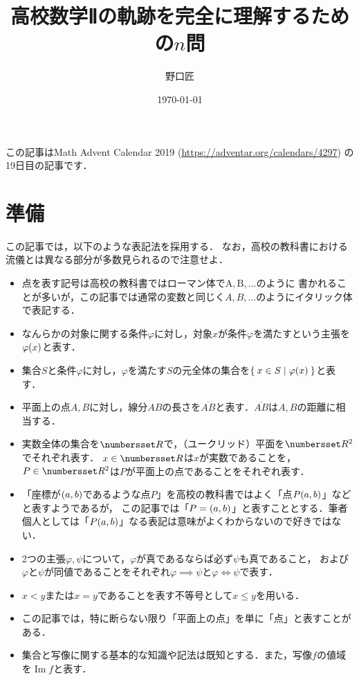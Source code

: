 \documentclass[11pt,a4paper]{ltjsarticle}
\title{高校数学Ⅱの軌跡を完全に理解するための$n$問}
\author{野口匠}
\affil{高知工科大学大学院工学研究科}
\date{\today}
\newcommand*{\length}[1]{\overline{#1}}
\newcommand*{\equivalent}{\Longleftrightarrow}
\newcommand*{\coord}[1]{\paren{#1}}
\DeclareMathOperator{\Image}{Im}
\theoremstyle{definition}
\begin{document}
%
\maketitle

この記事はMath Advent Calendar 2019 (\url{https://adventar.org/calendars/4297}) の19日目の記事です．

\section{準備} \label{sec:pre}

この記事では，以下のような表記法を採用する．
なお，高校の教科書における流儀とは異なる部分が多数見られるので注意せよ．

\begin{itemize}
  \item 点を表す記号は高校の教科書ではローマン体で$\mathrm{A}, \mathrm{B}, \dotsc$のように
        書かれることが多いが，この記事では通常の変数と同じく$A,B, \dotsc$のようにイタリック体で表記する．
  \item なんらかの対象に関する条件$\varphi$に対し，対象$x$が条件$\varphi$を満たすという主張を$\apply{\varphi}{x}$と表す．
  \item 集合$S$と条件$\varphi$に対し，$\varphi$を満たす$S$の元全体の集合を$\setintension{x \in S}{\apply{\varphi}{x}}$と表す．
  \item 平面上の点$A,B$に対し，線分$AB$の長さを$\length{AB}$と表す．$\length{AB}$は$A,B$の距離に相当する．
  \item 実数全体の集合を$\Real$で，（ユークリッド）平面を$\Real ^2$でそれぞれ表す．
        $x \in \Real$は$x$が実数であることを，$P \in \Real ^2$は$P$が平面上の点であることをそれぞれ表す．
  \item 「座標が$\coord{a,b}$であるような点$P$」を高校の教科書ではよく「点$P{\coord{a,b}}$」などと表すようであるが，
        この記事では「$P = \coord{a,b}$」と表すこととする．筆者個人としては「$P{\coord{a,b}}$」なる表記は意味がよくわからないので好きではない．
  \item 2つの主張$\varphi, \psi$について，$\varphi$が真であるならば必ず$\psi$も真であること，
        および$\varphi$と$\psi$が同値であることをそれぞれ$\varphi \implies \psi$と$\varphi \equivalent \psi$で表す．
  \item $x < y$または$x = y$であることを表す不等号として$x \leq y$を用いる．
  \item この記事では，特に断らない限り「平面上の点」を単に「点」と表すことがある．
  \item 集合と写像に関する基本的な知識や記法は既知とする．また，写像$f$の値域を$\Image f$と表す．
\end{itemize}
\end{document}
